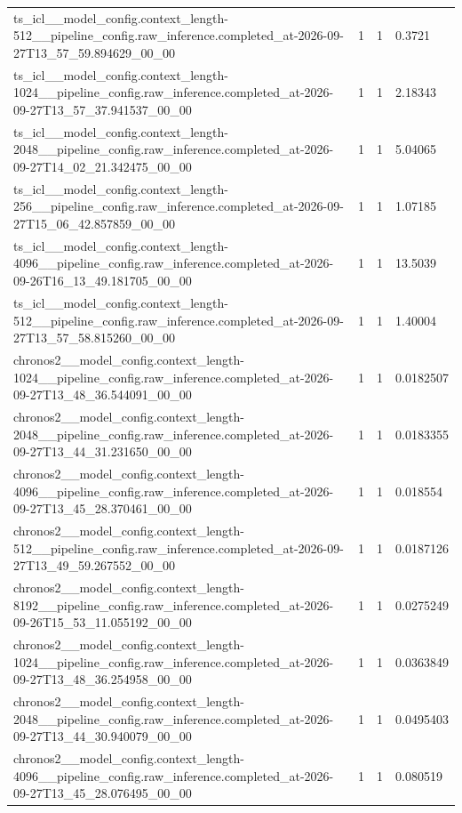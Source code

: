 \begin{tabular}{llll}
ts\_icl\_\_model\_config.context\_length-512\_\_pipeline\_config.raw\_inference.completed\_at-2026-09-27T13\_57\_59.894629\_00\_00 & 1 & 1 & 0.3721 \\
ts\_icl\_\_model\_config.context\_length-1024\_\_pipeline\_config.raw\_inference.completed\_at-2026-09-27T13\_57\_37.941537\_00\_00 & 1 & 1 & 2.18343 \\
ts\_icl\_\_model\_config.context\_length-2048\_\_pipeline\_config.raw\_inference.completed\_at-2026-09-27T14\_02\_21.342475\_00\_00 & 1 & 1 & 5.04065 \\
ts\_icl\_\_model\_config.context\_length-256\_\_pipeline\_config.raw\_inference.completed\_at-2026-09-27T15\_06\_42.857859\_00\_00 & 1 & 1 & 1.07185 \\
ts\_icl\_\_model\_config.context\_length-4096\_\_pipeline\_config.raw\_inference.completed\_at-2026-09-26T16\_13\_49.181705\_00\_00 & 1 & 1 & 13.5039 \\
ts\_icl\_\_model\_config.context\_length-512\_\_pipeline\_config.raw\_inference.completed\_at-2026-09-27T13\_57\_58.815260\_00\_00 & 1 & 1 & 1.40004 \\
chronos2\_\_model\_config.context\_length-1024\_\_pipeline\_config.raw\_inference.completed\_at-2026-09-27T13\_48\_36.544091\_00\_00 & 1 & 1 & 0.0182507 \\
chronos2\_\_model\_config.context\_length-2048\_\_pipeline\_config.raw\_inference.completed\_at-2026-09-27T13\_44\_31.231650\_00\_00 & 1 & 1 & 0.0183355 \\
chronos2\_\_model\_config.context\_length-4096\_\_pipeline\_config.raw\_inference.completed\_at-2026-09-27T13\_45\_28.370461\_00\_00 & 1 & 1 & 0.018554 \\
chronos2\_\_model\_config.context\_length-512\_\_pipeline\_config.raw\_inference.completed\_at-2026-09-27T13\_49\_59.267552\_00\_00 & 1 & 1 & 0.0187126 \\
chronos2\_\_model\_config.context\_length-8192\_\_pipeline\_config.raw\_inference.completed\_at-2026-09-26T15\_53\_11.055192\_00\_00 & 1 & 1 & 0.0275249 \\
chronos2\_\_model\_config.context\_length-1024\_\_pipeline\_config.raw\_inference.completed\_at-2026-09-27T13\_48\_36.254958\_00\_00 & 1 & 1 & 0.0363849 \\
chronos2\_\_model\_config.context\_length-2048\_\_pipeline\_config.raw\_inference.completed\_at-2026-09-27T13\_44\_30.940079\_00\_00 & 1 & 1 & 0.0495403 \\
chronos2\_\_model\_config.context\_length-4096\_\_pipeline\_config.raw\_inference.completed\_at-2026-09-27T13\_45\_28.076495\_00\_00 & 1 & 1 & 0.080519 \\

\end{tabular}
